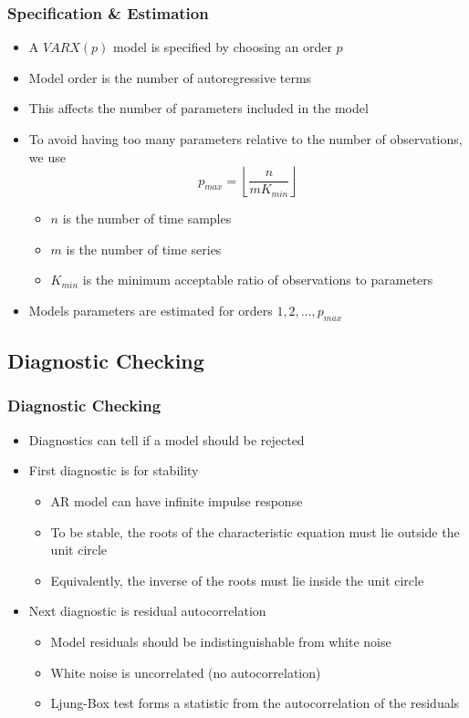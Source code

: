 \documentclass[presentation]{beamer}
\begin{document}
\begin{frame}[t]
\frametitle{Specification \& Estimation}
\begin{itemize}
\item{A $VARX(p)$ model is specified by choosing an order $p$}
\item{Model order is the number of autoregressive terms}
\item{This affects the number of parameters included in the model}
\item{To avoid having too many parameters relative to the number of observations, we use
  \begin{equation}
  p_{max} = \left \lfloor \frac{n}{m K_{min}} \right \rfloor
  \end{equation}
  
  \begin{itemize}
    \item{$n$ is the number of time samples}
    \item{$m$ is the number of time series}
    \item{$K_{min}$ is the minimum acceptable ratio of observations to parameters}
  \end{itemize}
  }
\item{Models parameters are estimated for orders $1, 2,..., p_{max}$}
\end{itemize}
\end{frame}


\subsection{Diagnostic Checking}

\begin{frame}[t]
\frametitle{Diagnostic Checking}
\begin{itemize}
\item{Diagnostics can tell if a model should be rejected}
\item{First diagnostic is for stability
  \begin{itemize}
  \item{AR model can have infinite impulse response}
  \item{To be stable, the roots of the characteristic equation must lie outside the unit circle \cite[p. 56]{box_jenkins_reinsel_2008}}
  \item{Equivalently, the inverse of the roots must lie inside the unit circle}
  \end{itemize}
}
\item{Next diagnostic is residual autocorrelation
  \begin{itemize}
    \item{Model residuals should be indistinguishable from white noise}
    \item{White noise is uncorrelated (no autocorrelation)}
    \item{Ljung-Box test forms a statistic from the autocorrelation of the residuals}
  \end{itemize}
}
\end{itemize}
\end{frame}
\end{document}
